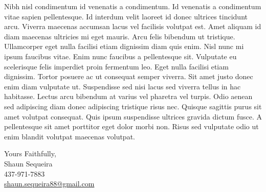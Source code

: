 Nibh nisl condimentum id venenatis a condimentum. Id venenatis a condimentum vitae sapien pellentesque. Id interdum velit laoreet id donec ultrices tincidunt arcu. Viverra maecenas accumsan lacus vel facilisis volutpat est. Amet aliquam id diam maecenas ultricies mi eget mauris. Arcu felis bibendum ut tristique. Ullamcorper eget nulla facilisi etiam dignissim diam quis enim. Nisl nunc mi ipsum faucibus vitae. Enim nunc faucibus a pellentesque sit. Vulputate eu scelerisque felis imperdiet proin fermentum leo. Eget nulla facilisi etiam dignissim. Tortor posuere ac ut consequat semper viverra. Sit amet justo donec enim diam vulputate ut. Suspendisse sed nisi lacus sed viverra tellus in hac habitasse. Lectus arcu bibendum at varius vel pharetra vel turpis. Odio aenean sed adipiscing diam donec adipiscing tristique risus nec. Quisque sagittis purus sit amet volutpat consequat. Quis ipsum suspendisse ultrices gravida dictum fusce. A pellentesque sit amet porttitor eget dolor morbi non. Risus sed vulputate odio ut enim blandit volutpat maecenas volutpat. \par


\vspace{0.5cm}
\raggedright
Yours Faithfully, \\ Shaun Sequeira \\ 437-971-7883 \\ \href{mailto:shaun.sequeira88@gmail.com}{shaun.sequeira88@gmail.com}

